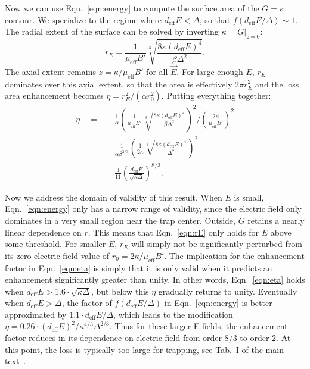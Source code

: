\documentclass[%
 reprint,
 amsmath,amssymb,
 aps,
prl,
]{revtex4-1}
\begin{document}
Now we can use Eqn.~\ref{eqn:energy} to compute the surface area of the $G=\kappa$ contour.
We specialize to the regime where $d_\text{eff}E<\Delta$, so that $f(d_\text{eff}E/\Delta)\sim 1$.
The radial extent of the surface can be solved by inverting $\kappa=G|_{z=0}$:
\begin{equation}
\label{eqn:rE}
r_E = \frac{1}{\mu_\text{eff}B'}\sqrt[3]{\frac{8\kappa(d_\text{eff}E)^4}{\beta\Delta^2}}.
\end{equation}
The axial extent remains $z=\kappa/\mu_\text{eff}B'$ for all $\vec{E}$.
For large enough $E$, $r_E$ dominates over this axial extent, so that the area is effectively $2\pi r_E^2$ and the loss area enhancement becomes $\eta = r_E^2/(\alpha r_0^2)$.
Putting everything together:
\begin{equation}
\begin{split}
\label{eqn:eta}
\eta\quad =&\quad \frac{1}{\alpha}\left(\frac{1}{\mu_\text{eff}B'}\sqrt[3]{\frac{8\kappa(d_\text{eff}E)^4}{\beta\Delta^2}}\right)^2\bigg/\left(\frac{2\kappa}{\mu_\text{eff}B'}\right)^2\\
\quad=&\quad \frac{1}{\alpha\beta^{2/3}}\left(\frac{1}{2\kappa}\sqrt[3]{\frac{8\kappa(d_\text{eff}E)^4}{\Delta^2}}\right)^2\\
\quad=&\quad\frac{3}{11}\left(\frac{d_\text{eff}E}{\sqrt{\kappa\Delta}}\right)^{8/3}.
\end{split}
\end{equation}

Now we address the domain of validity of this result.
When $E$ is small, Eqn.~\ref{eqn:energy} only has a narrow range of validity, since the electric field only dominates in a very small region near the trap center.
Outside, $G$ retains a nearly linear dependence on $r$.
This means that Eqn.~\ref{eqn:rE} only holds for $E$ above some threshold.
For smaller $E$, $r_E$ will simply not be significantly perturbed from its zero electric field value of $r_0=2\kappa/\mu_\text{eff}B'$.
The implication for the enhancement factor in Eqn.~\ref{eqn:eta} is simply that it is only valid when it predicts an enhancement significantly greater than unity.
In other words, Eqn.~\ref{eqn:eta} holds when $d_\text{eff}E>1.6\!\cdot\!\sqrt{\kappa\Delta}$, but below this $\eta$ gradually returns to unity.
Eventually when $d_\text{eff}E>\Delta$, the factor of $f(d_\text{eff}E/\Delta)$ in Eqn.~\ref{eqn:energy} is better approximated by $1.1\!\cdot\!d_\text{eff}E/\Delta$, which leads to the modification $\eta=0.26\!\cdot\!(d_\text{eff}E)^2/\kappa^{4/3}\Delta^{2/3}$.
Thus for these larger E-fields, the enhancement factor reduces in its dependence on electric field from order $8/3$ to order $2$.
At this point, the loss is typically too large for trapping, see Tab.~I of the main text~\cite{smt}.



\end{document}
